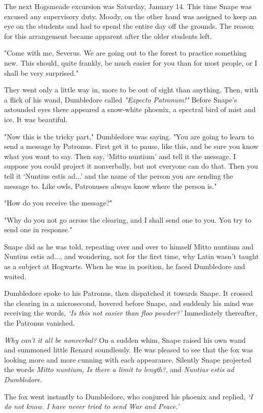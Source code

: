 \documentclass[a4paper,11pt]{article}
\begin{document}
The next Hogsmeade excursion was Saturday, January 14. This time Snape was excused any supervisory duty. Moody, on the other hand was assigned to keep an eye on the students and had to spend the entire day off the grounds. The reason for this arrangement became apparent after the older students left.

"Come with me, Severus. We are going out to the forest to practice something new. This should, quite frankly, be much easier for you than for most people, or I shall be very surprised."

They went only a little way in, more to be out of sight than anything. Then, with a flick of his wand, Dumbledore called \emph{"Expecto Patronum!"} Before Snape's astounded eyes there appeared a snow-white phoenix, a spectral bird of mist and ice. It was beautiful.

"Now this is the tricky part," Dumbledore was saying. "You are going to learn to send a message by Patronus. First get it to pause, like this, and be sure you know what you want to say. Then say, `Mitto nuntium' and tell it the message. I suppose you could project it nonverbally, but not everyone can do that. Then you tell it `Nuntius estis ad...' and the name of the person you are sending the message to. Like owls, Patronuses always know where the person is."

"How do you receive the message?"

"Why do you not go across the clearing, and I shall send one to you. You try to send one in response."

Snape did as he was told, repeating over and over to himself Mitto nuntium and Nuntius estis ad..., and wondering, not for the first time, why Latin wasn't taught as a subject at Hogwarts. When he was in position, he faced Dumbledore and waited.

Dumbledore spoke to his Patronus, then dispatched it towards Snape. It crossed the clearing in a microsecond, hovered before Snape, and suddenly his mind was receiving the words, \emph{`Is this not easier than floo powder?'} Immediately thereafter, the Patronus vanished.

\emph{Why can't it all be nonverbal?} On a sudden whim, Snape raised his own wand and summoned little Renard soundlessly. He was pleased to see that the fox was looking more and more cunning with each appearance. Silently Snape projected the words \emph{Mitto nuntium, Is there a limit to length?}, and \emph{Nuntius estis ad Dumbledore}.

The fox went instantly to Dumbledore, who conjured his phoenix and replied, \emph{`I do not know. I have never tried to send War and Peace.'}
\end{document}
